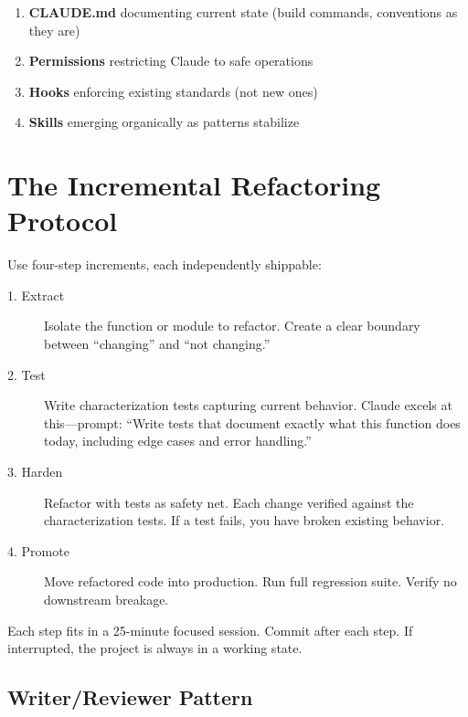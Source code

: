 \begin{enumerate}
  \item \textbf{CLAUDE.md} documenting current state (build commands, conventions as they are)
  \item \textbf{Permissions} restricting Claude to safe operations
  \item \textbf{Hooks} enforcing existing standards (not new ones)
  \item \textbf{Skills} emerging organically as patterns stabilize
\end{enumerate}

\section{The Incremental Refactoring Protocol}
\label{sec:refactoring-protocol}

Use four-step increments, each independently shippable:

\begin{description}
  \item[1. Extract] Isolate the function or module to refactor.
    Create a clear boundary between ``changing'' and ``not changing.''

  \item[2. Test] Write characterization tests capturing current behavior.
    Claude excels at this---prompt: ``Write tests that document exactly
    what this function does today, including edge cases and error handling.''

  \item[3. Harden] Refactor with tests as safety net.
    Each change verified against the characterization tests.
    If a test fails, you have broken existing behavior.

  \item[4. Promote] Move refactored code into production.
    Run full regression suite. Verify no downstream breakage.
\end{description}

\begin{tipbox}
Each step fits in a 25-minute focused session.
Commit after each step.
If interrupted, the project is always in a working state.
\end{tipbox}

\subsection{Writer/Reviewer Pattern}

